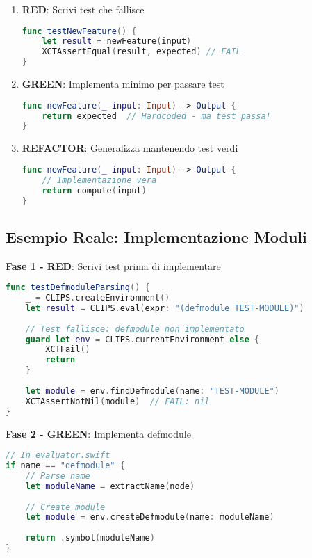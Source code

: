 \begin{enumerate}
\item \textbf{RED}: Scrivi test che fallisce
\begin{lstlisting}[language=Swift]
func testNewFeature() {
    let result = newFeature(input)
    XCTAssertEqual(result, expected) // FAIL
}
\end{lstlisting}

\item \textbf{GREEN}: Implementa minimo per passare test
\begin{lstlisting}[language=Swift]
func newFeature(_ input: Input) -> Output {
    return expected  // Hardcoded - ma test passa!
}
\end{lstlisting}

\item \textbf{REFACTOR}: Generalizza mantenendo test verdi
\begin{lstlisting}[language=Swift]
func newFeature(_ input: Input) -> Output {
    // Implementazione vera
    return compute(input)
}
\end{lstlisting}
\end{enumerate}

\subsection{Esempio Reale: Implementazione Moduli}

\textbf{Fase 1 - RED}: Scrivi test prima di implementare

\begin{lstlisting}[language=Swift]
func testDefmoduleParsing() {
    _ = CLIPS.createEnvironment()
    let result = CLIPS.eval(expr: "(defmodule TEST-MODULE)")
    
    // Test fallisce: defmodule non implementato
    guard let env = CLIPS.currentEnvironment else {
        XCTFail()
        return
    }
    
    let module = env.findDefmodule(name: "TEST-MODULE")
    XCTAssertNotNil(module)  // FAIL: nil
}
\end{lstlisting}

\textbf{Fase 2 - GREEN}: Implementa defmodule

\begin{lstlisting}[language=Swift]
// In evaluator.swift
if name == "defmodule" {
    // Parse name
    let moduleName = extractName(node)
    
    // Create module
    let module = env.createDefmodule(name: moduleName)
    
    return .symbol(moduleName)
}
\end{lstlisting}

